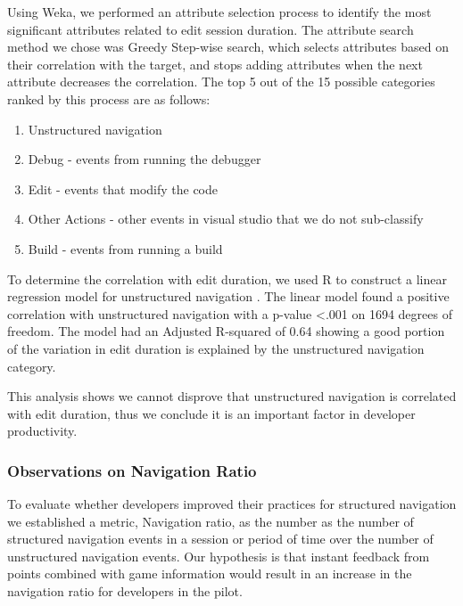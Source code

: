 \documentclass{sig-alternate}
\begin{document}
Using Weka\cite{Hall2009WEKA}, we performed an attribute selection process to identify the most significant attributes related to edit session duration.  The attribute search method we chose was Greedy Step-wise search, which selects attributes based on their correlation with the target, and stops adding attributes when the next attribute decreases the correlation.    The top 5 out of the 15 possible categories ranked by this process are as follows:
\begin{enumerate}[itemsep=0mm]
\item Unstructured navigation
\item Debug - events from running the debugger
\item Edit - events that modify the code
\item Other Actions - other events in visual studio that we do not sub-classify
\item Build - events from running a build
\end{enumerate}

To determine the correlation with edit duration, we used R\cite{Rcitation} to construct a linear regression model for unstructured navigation .  The linear model found a positive correlation with unstructured navigation with a p-value <.001 on 1694 degrees of freedom.  The model had an Adjusted R-squared of 0.64 showing a good portion of the variation in edit duration is explained by the unstructured navigation category. 

This analysis shows we cannot disprove that unstructured navigation is correlated with edit duration, thus we conclude it is an important factor in developer productivity.  

\subsubsection{Observations on Navigation Ratio}

To evaluate whether developers improved their practices for structured navigation we established a metric, Navigation ratio, as the number as the number of structured navigation events in a session or period of time over the number of unstructured navigation events.  Our hypothesis is that instant feedback from points combined with game information would result in an increase in the navigation ratio for developers in the pilot.
\end{document}
